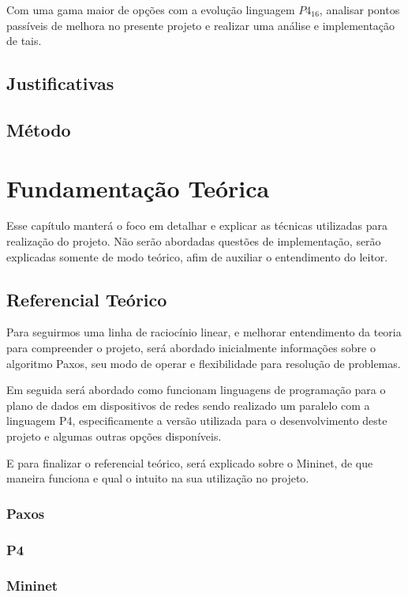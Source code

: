 \documentclass[12pt,
openright, 
oneside,
a4paper,
brazil]{facom-ufu-abntex2}
\begin{document}
Com uma gama maior de opções com a evolução linguagem $P4_{16}$, 
analisar pontos passíveis de melhora no presente projeto e realizar uma 
análise e implementação de tais.

\section{Justificativas}
\section{Método}

\chapter{Fundamentação Teórica}
Esse capítulo manterá o foco em detalhar e explicar as técnicas utilizadas
para realização do projeto. Não serão abordadas questões de implementação,
serão explicadas somente de modo teórico, afim de auxiliar o entendimento do leitor.

\section{Referencial Teórico}
Para seguirmos uma linha de raciocínio linear, e melhorar entendimento da teoria
para compreender o projeto, será abordado inicialmente informações sobre o 
algoritmo Paxos, seu modo de operar e flexibilidade para resolução de problemas.

Em seguida será abordado como funcionam linguagens de programação para o plano de
dados em dispositivos de redes sendo realizado um paralelo com a linguagem P4, 
especificamente a versão utilizada para o desenvolvimento deste projeto e algumas
outras opções disponíveis.

E para finalizar o referencial teórico, será explicado sobre o Mininet, de que
maneira funciona e qual o intuito na sua utilização no projeto.

\subsection{Paxos}
\subsection{P4}
\subsection{Mininet}
\end{document}
